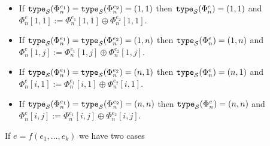 \begin{itemize}
\begin{itemize}
	\item If $\texttt{type}_{\mathcal{S}}(\Phi^{e_1}_n)=\texttt{type}_{\mathcal{S}}(\Phi^{e_2}_n)=(1, 1)$  then $\texttt{type}_{\mathcal{S}}(\Phi^{e}_n)=(1, 1)$ and $\Phi^e_n[1,1]:=\Phi^{e_1}_n[1,1] \oplus \Phi^{e_2}_n[1,1]$.
  \item If $\texttt{type}_{\mathcal{S}}(\Phi^{e_1}_n)=\texttt{type}_{\mathcal{S}}(\Phi^{e_2}_n)=(1, n)$  then $\texttt{type}_{\mathcal{S}}(\Phi^{e}_n)=(1, n)$ and $\Phi^e_n[1,j]:=\Phi^{e_1}_n[1,j] \oplus \Phi^{e_2}_n[1,j]$.
  \item If $\texttt{type}_{\mathcal{S}}(\Phi^{e_1}_n)=\texttt{type}_{\mathcal{S}}(\Phi^{e_2}_n)=(n, 1)$  then $\texttt{type}_{\mathcal{S}}(\Phi^{e}_n)=(n, 1)$ and $\Phi^e_n[i,1]:=\Phi^{e_1}_n[i,1] \oplus \Phi^{e_2}_n[i,1]$.
  \item If $\texttt{type}_{\mathcal{S}}(\Phi^{e_1}_n)=\texttt{type}_{\mathcal{S}}(\Phi^{e_2}_n)=(n, n)$  then $\texttt{type}_{\mathcal{S}}(\Phi^{e}_n)=(n, n)$ and $\Phi^e_n[i,j]:=\Phi^{e_1}_n[i,j] \oplus \Phi^{e_2}_n[i,j]$.
\end{itemize}
\end{itemize}
If $e=f(e_1, \ldots, e_k)$ we have two cases

